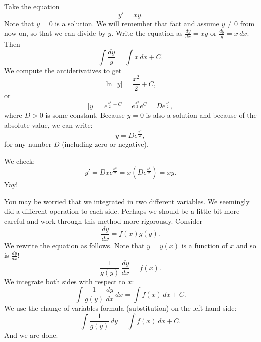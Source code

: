 \begin{example} \label{example:yprimeisxy}
Take the equation
\begin{equation*}
y' = xy .
\end{equation*}
Note that $y=0$ is a solution.  We will remember that fact and
assume $y \not =0$ from now on, so that we can divide by $y$.
Write the equation as $\frac{dy}{dx} = xy$ or
$\frac{dy}{y} = x \, dx$.
Then
\begin{equation*}
\int \frac{dy}{y} = \int x\,dx + C .
\end{equation*}
We compute the antiderivatives to get
\begin{equation*}
\ln \, \lvert y\rvert = \frac{x^2}{2} + C ,
\end{equation*}
or
\begin{equation*}
\lvert y \rvert = e^{\frac{x^2}{2} + C} = e^{\frac{x^2}{2}} e^C = D e^{\frac{x^2}{2}} ,
\end{equation*}
where $D > 0$ is some constant.  Because $y=0$ is also a solution and because
of the absolute value, we can write:
\begin{equation*}
y = D e^{\frac{x^2}{2}} ,
\end{equation*}
for any number $D$ (including zero or negative).

We check:
\begin{equation*}
y' = D x e^{\frac{x^2}{2}} = x \left( D e^{\frac{x^2}{2}} \right) = xy .
\end{equation*}
Yay!
\end{example}

You may be worried that we 
integrated in two different variables.
We seemingly did a different operation to each side.
Perhaps we should be a little bit more careful
and work through this method more rigorously.
Consider
\begin{equation*}
\frac{dy}{dx} = f(x)g(y) .
\end{equation*}
We rewrite the equation as follows.
Note that $y = y(x)$ is a function of $x$ and so is
$\frac{dy}{dx}$!
\begin{equation*}
\frac{1}{g(y)}\,\frac{dy}{dx} = f(x) .
\end{equation*}
We integrate both sides with respect to $x$:
\begin{equation*}
\int \frac{1}{g(y)}\,\frac{dy}{dx} \,dx = \int f(x) \,dx + C .
\end{equation*}
We use the change of variables formula (substitution) on the left-hand side:
\begin{equation*}
\int \frac{1}{g(y)}\,dy = \int f(x) \,dx + C .
\end{equation*}
And we are done.

